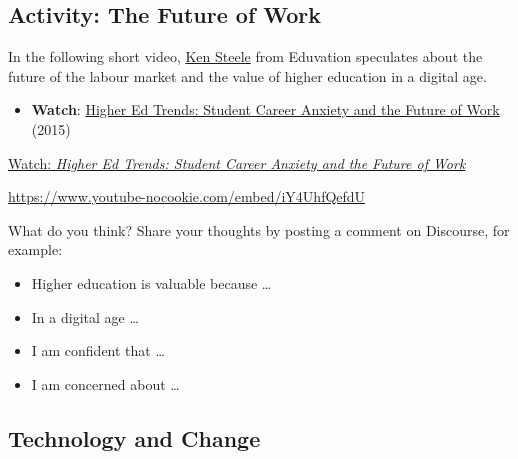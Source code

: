 \documentclass[
  letterpaper,
  DIV=11,
  numbers=noendperiod]{scrreprt}
\providecommand{\tightlist}{%
  \setlength{\itemsep}{0pt}\setlength{\parskip}{0pt}}\usepackage{longtable,booktabs,array}
\begin{document}
\subsection{Activity: The Future of
Work}\label{activity-the-future-of-work}

\begin{tcolorbox}[enhanced jigsaw, toprule=.15mm, colback=white, colframe=quarto-callout-note-color-frame, bottomtitle=1mm, leftrule=.75mm, coltitle=black, titlerule=0mm, rightrule=.15mm, colbacktitle=quarto-callout-note-color!10!white, left=2mm, title={Learning Activity}, opacitybacktitle=0.6, opacityback=0, breakable, toptitle=1mm, arc=.35mm, bottomrule=.15mm]

In the following short video, \href{http://eduvation.ca/bio/}{Ken
Steele} from Eduvation speculates about the future of the labour market
and the value of higher education in a digital age.

\begin{itemize}
\tightlist
\item
  \textbf{Watch}:
  \href{https://www.youtube.com/watch?v=iY4UhfQefdU}{Higher Ed Trends:
  Student Career Anxiety and the Future of Work} (2015)
\end{itemize}

\href{https://www.youtube.com/watch?v=iY4UhfQefdU}{Watch: \emph{Higher
Ed Trends: Student Career Anxiety and the Future of Work}}

\url{https://www.youtube-nocookie.com/embed/iY4UhfQefdU}

What do you think? Share your thoughts by posting a comment on
Discourse, for example:

\begin{itemize}
\tightlist
\item
  Higher education is valuable because \ldots{}
\item
  In a digital age \ldots{}
\item
  I am confident that \ldots{}
\item
  I am concerned about \ldots{}
\end{itemize}

\end{tcolorbox}

\subsection*{Technology and Change}\label{technology-and-change}
\end{document}
